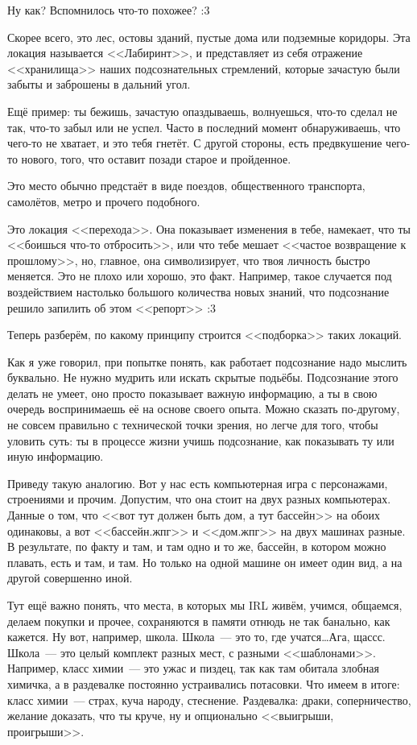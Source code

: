 \documentclass[a5paper,12pt,twoside]{memoir}
\begin{document}
Ну как? Вспомнилось что-то похожее? :3 

Скорее всего, это лес, остовы зданий, пустые дома или подземные коридоры. Эта локация называется <<Лабиринт>>, и представляет из себя отражение <<хранилища>> наших подсознательных стремлений, которые зачастую были забыты и заброшены в дальний угол. 

Ещё пример: ты бежишь, зачастую опаздываешь, волнуешься, что-то сделал не так, что-то забыл или не успел. Часто в последний момент обнаруживаешь, что чего-то не хватает, и это тебя гнетёт. С другой стороны, есть предвкушение чего-то нового, того, что оставит позади старое и пройденное.

Это место обычно предстаёт в виде поездов, общественного транспорта, самолётов, метро и прочего подобного. 

Это локация <<перехода>>. Она показывает изменения в тебе, намекает, что ты <<боишься что-то отбросить>>, или что тебе мешает <<частое возвращение к прошлому>>, но, главное, она символизирует, что твоя личность быстро меняется. Это не плохо или хорошо, это факт. Например, такое случается под воздействием настолько большого количества новых знаний, что подсознание решило запилить об этом <<репорт>> :3
   
Теперь разберём, по какому принципу строится <<подборка>> таких локаций.
 
Как я уже говорил, при попытке понять, как работает подсознание надо мыслить буквально. Не нужно мудрить или искать скрытые подьёбы. Подсознание этого делать не умеет, оно просто показывает важную информацию, а ты в свою очередь воспринимаешь её на основе своего опыта. Можно сказать по-другому, не совсем правильно с технической точки зрения, но легче для того, чтобы уловить суть: ты в процессе жизни учишь подсознание, как показывать ту или иную информацию.
   
Приведу такую аналогию. Вот у нас есть компьютерная игра с персонажами, строениями и прочим. Допустим, что она стоит на двух разных компьютерах. Данные о том, что <<вот тут должен быть дом, а тут бассейн>> на обоих одинаковы, а вот <<бассейн.жпг>> и <<дом.жпг>> на двух машинах разные. В результате, по факту и там, и там одно и то же, бассейн, в котором можно плавать, есть и там, и там. Но только на одной машине он имеет один вид, а на другой совершенно иной. 

Тут ещё важно понять, что места, в которых мы IRL живём, учимся, общаемся, делаем покупки и прочее, сохраняются в памяти отнюдь не так банально, как кажется. Ну вот, например, школа. Школа~--- это то, где учатся\ldots Ага, щассс. Школа~--- это целый комплект разных мест, с разными <<шаблонами>>. Например, класс химии~--- это ужас и пиздец, так как там обитала злобная химичка, а в раздевалке постоянно устраивались потасовки. Что имеем в итоге: класс химии~--- страх, куча народу, стеснение. Раздевалка: драки, соперничество, желание доказать, что ты круче, ну и опционально <<выигрыши, проигрыши>>.
 
\end{document}
